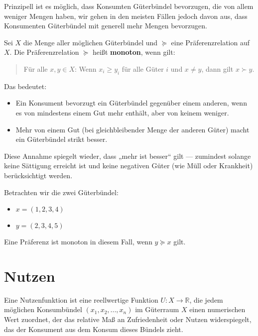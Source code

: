 Prinzipell ist es möglich, dass Konsumten Güterbündel bevorzugen, die von allem weniger Mengen haben, wir gehen in den meisten Fällen jedoch davon aus, dass Konsumenten Güterbündel mit generell mehr Mengen bevorzugen.

\begin{definition}
	Sei $X$ die Menge aller möglichen Güterbündel und $\succeq$ eine Präferenzrelation auf $X$.
	Die Präferenzrelation $\succeq$ heißt \textbf{monoton}, wenn gilt:

	\begin{quote}
		Für alle $x, y \in X$: Wenn $x_i \geq y_i$ für alle Güter $i$ und $x \neq y$, dann gilt $x \succ y$.
	\end{quote}

\end{definition}
\noindent Das bedeutet:
\begin{itemize}
	\item Ein Konsument bevorzugt ein Güterbündel gegenüber einem anderen, wenn es von mindestens einem Gut mehr enthält, aber von keinem weniger.
	\item Mehr von einem Gut (bei gleichbleibender Menge der anderen Güter) macht ein Güterbündel strikt besser.
\end{itemize}

\begin{remark}
	Diese Annahme spiegelt wieder, dass „mehr ist besser“ gilt — zumindest solange keine Sättigung erreicht ist und keine negativen Güter (wie Müll oder Krankheit) berücksichtigt werden.
\end{remark}


\begin{example}
	Betrachten wir die zwei Güterbündel:
	\begin{itemize}
		\item $x=(1,2,3,4)$
		\item $y=(2,3,4,5)$
	\end{itemize}
	Eine Präferenz ist monoton in diesem Fall, wenn $y \succeq x$ gilt.
\end{example}


\section{Nutzen}

Eine Nutzenfunktion ist eine reellwertige Funktion $U: X \rightarrow \mathbb{R}$, die jedem möglichen Konsumbündel $(x_1, x_2, ..., x_n)$ im Güterraum $X$ einen numerischen Wert zuordnet, der das relative Maß an Zufriedenheit oder Nutzen widerspiegelt, das der Konsument aus dem Konsum dieses Bündels zieht.


